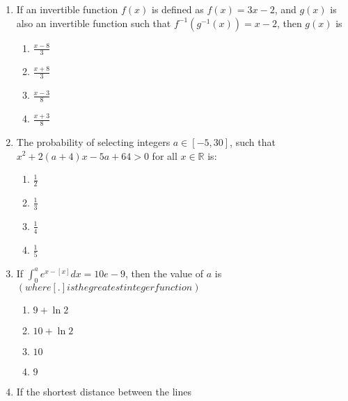 \documentclass[journal]{IEEEtran}
\newcommand{\brak}[1]{\left( #1 \right)}
\newcommand{\sbrak}[1]{\left[ #1 \right]}
\newcommand{\gt}{>}
\begin{document}
\begin{enumerate}
    \item If an invertible function $f\brak{x}$ is defined as $f\brak{x} = 3x - 2$, and $g\brak{x}$ is also an invertible function such that $f^{-1}\brak{g^{-1}\brak{x}} = x - 2$, then $g\brak{x}$ is
    
        \begin{multicols}{4}
        \begin{enumerate}
        \item $\frac{x - 8}{3}$
        \item $\frac{x + 8}{3}$
        \item $\frac{x - 3}{8}$
        \item $\frac{x + 3}{8}$
        \end{enumerate}
        \end{multicols}
        
    \item The probability of selecting integers $a \in \sbrak{-5, 30}$, such that $x^2 + 2\brak{a + 4}x - 5a + 64 \gt 0$ for all $x \in \mathbb{R}$ is:
    
        \begin{multicols}{4}
        \begin{enumerate}
        \item $\frac{1}{2}$
        \item $\frac{1}{3}$
        \item $\frac{1}{4}$
        \item $\frac{1}{5}$
        \end{enumerate}
        \end{multicols}
        
    \item If $\int_0^a e^{x - \sbrak{x}} dx = 10e - 9$, then the value of $a$ is $\brak{where \sbrak{.} is the greatest integer function}$
    
        \begin{multicols}{4}
        \begin{enumerate}
        \item $9 + \ln 2$
        \item $10 + \ln 2$
        \item $10$
        \item $9$
        \end{enumerate}
        \end{multicols}

    \item If the shortest distance between the lines


\end{enumerate}
\end{document}
